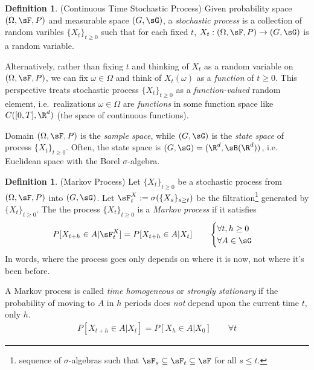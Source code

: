 \documentclass[12pt]{article}
\theoremstyle{plain}
\theoremstyle{definition}
\newtheorem{defn}[thm]{Definition}
\theoremstyle{remark}
\newcommand{\ra}{\rightarrow}
\begin{document}
\begin{defn}(Continuous Time Stochastic Process)
Given probability space $(\Omega,\sF,P)$ and measurable space
$(G,\sG)$, a \emph{stochastic process} is a collection of random
varibles $\{X_t\}_{t\geq 0}$ such that for each fixed $t$,
$X_t:(\Omega,\sF,P)\ra(G,\sG)$ is a random variable.

Alternatively, rather than fixing $t$ and thinking of $X_t$ as a random
variable on $(\Omega,\sF,P)$, we can fix $\omega\in\Omega$ and think of
$X_t(\omega)$ as a \emph{function} of $t\geq 0$.
This perspective treats stochastic process $\{X_t\}_{t\geq 0}$ as a
\emph{function-valued} random element, i.e.\ realizations
$\omega\in\Omega$ are \emph{functions} in some function space like
$C([0,T],\R^d)$ (the space of continuous functions).

Domain $(\Omega,\sF,P)$ is the \emph{sample space}, while $(G,\sG)$
is the \emph{state space} of process $\{X_t\}_{t\geq 0}$.
Often, the state space is $(G,\sG)=(\R^d,\sB(\R^d))$, i.e. Euclidean
space with the Borel $\sigma$-algebra.
\end{defn}

\begin{defn}(Markov Process)
Let $\{X_t\}_{t\geq 0}$ be a stochastic process from $(\Omega,\sF,P)$
into $(G,\sG)$.
Let $\sF_t^X:=\sigma(\{X_s\}_{s\geq t})$ be the filtration\footnote{%
  sequence of $\sigma$-algebras such that
  $\sF_s\subseteq\sF_t\subseteq\sF$ for all $s\leq t$.
}
generated by $\{X_t\}_{t\geq 0}$.
The the process $\{X_t\}_{t\geq 0}$ is a \emph{Markov process} if it
satisfies
\begin{align*}
  P[X_{t+h}\in A|\sF_t^X]
  =
  P[X_{t+h}\in A|X_t]
  \qquad
  \begin{cases}
    \forall t,h\geq 0
    \\
    \forall A\in\sG
  \end{cases}
\end{align*}
In words, where the process goes only depends on where it is now, not
where it's been before.

A Markov process is called \emph{time homogeneous} or
\emph{strongly stationary} if the probability of moving to $A$ in $h$
periods does \emph{not} depend upon the current time $t$, only $h$.
\begin{align}
  P[X_{t+h}\in A|X_t]
  =
  P[X_{h}\in A|X_0]
  \qquad
  \forall t
  \label{timehomog}
\end{align}
\end{defn}
\end{document}
